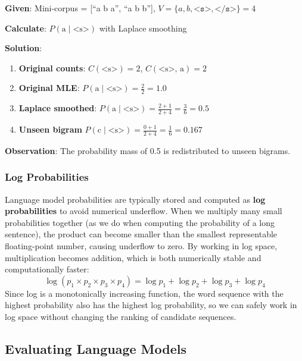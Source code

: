 \documentclass[11pt,a4paper]{article}
\begin{document}
\begin{tcolorbox}[colback=green!5!white,colframe=green!75!black,title=\textbf{Worked Example 3: Bigram Probability with Add-One Smoothing}]
\textbf{Given}: Mini-corpus = [``a b a'', ``a b b''], $V = \{a, b, \texttt{<s>}, \texttt{</s>}\} = 4$

\textbf{Calculate}: $P(\text{a} \mid \text{<s>})$ with Laplace smoothing

\textbf{Solution}:
\begin{enumerate}
    \item \textbf{Original counts}: $C(\text{<s>}) = 2$, $C(\text{<s>, a}) = 2$
    \item \textbf{Original MLE}: $P(\text{a} \mid \text{<s>}) = \frac{2}{2} = 1.0$
    \item \textbf{Laplace smoothed}: $P(\text{a} \mid \text{<s>}) = \frac{2+1}{2+4} = \frac{3}{6} = 0.5$
    \item \textbf{Unseen bigram} $P(\text{c} \mid \text{<s>}) = \frac{0+1}{2+4} = \frac{1}{6} = 0.167$
\end{enumerate}

\textbf{Observation}: The probability mass of 0.5 is redistributed to unseen bigrams.
\end{tcolorbox}

\subsubsection{Log Probabilities}

Language model probabilities are typically stored and computed as \textbf{log probabilities} to avoid numerical underflow. When we multiply many small probabilities together (as we do when computing the probability of a long sentence), the product can become smaller than the smallest representable floating-point number, causing underflow to zero. By working in log space, multiplication becomes addition, which is both numerically stable and computationally faster:
\[
\log(p_1 \times p_2 \times p_3 \times p_4) = \log p_1 + \log p_2 + \log p_3 + \log p_4
\]
Since log is a monotonically increasing function, the word sequence with the highest probability also has the highest log probability, so we can safely work in log space without changing the ranking of candidate sequences.

\subsection{Evaluating Language Models}
\end{document}
